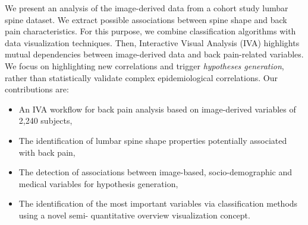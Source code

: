 \documentclass[a4paper,twoside]{style/article}
\begin{document}
We present an analysis of the image-derived data from a cohort study lumbar spine dataset.
We extract possible associations between spine shape and back pain characteristics.
For this purpose, we combine classification algorithms with data visualization techniques.
Then, Interactive Visual Analysis (IVA) highlights mutual dependencies between image-derived data and back pain-related variables.
We focus on highlighting new correlations and trigger \emph{hypotheses generation}, rather than statistically validate complex epidemiological correlations.
Our contributions are:
\begin{itemize}
\item An IVA workflow for back pain analysis based on image-derived variables of 2,240 subjects,
\item The identification of lumbar spine shape properties potentially associated with back pain,
\item The detection of associations between image-based, socio-demographic and medical variables for hypothesis generation,
\item The identification of the most important variables via classification methods using a novel semi- quantitative overview visualization concept. %
\end{itemize}
\end{document}
